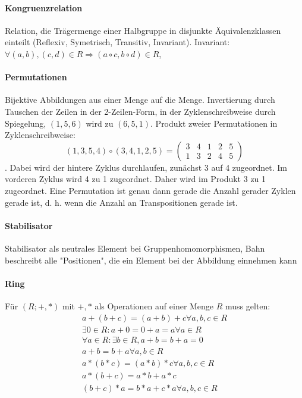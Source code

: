 \documentclass[12pt,landscape]{article}
\begin{document}
\begin{multicols}{3}
\paragraph{Kongruenzrelation} Relation, die Trägermenge einer Halbgruppe in disjunkte Äquivalenzklassen einteilt (Reflexiv, Symetrisch, Transitiv, Invariant). Invariant: $\forall (a,b),(c,d) \in R \Rightarrow (a \circ c, b \circ d) \in R$, 
\paragraph{Permutationen} Bijektive Abbildungen aus einer Menge auf die Menge. Invertierung durch Tauschen der Zeilen in der 2-Zeilen-Form, in der Zyklenschreibweise durch Spiegelung, $(1, 5, 6)$ wird zu $(6, 5, 1)$. Produkt zweier Permutationen in Zyklenschreibweise: \[(1, 3, 5, 4) \circ (3, 4, 1, 2, 5) = \begin{pmatrix}
3 & 4 & 1 & 2 & 5 \\
1 & 3 & 2 & 4 & 5
\end{pmatrix}\]. Dabei wird der hintere Zyklus durchlaufen, zunächst 3 auf 4 zugeordnet. Im vorderen Zyklus wird 4 zu 1 zugeordnet. Daher wird im Produkt 3 zu 1 zugeordnet. Eine Permutation ist genau dann gerade die Anzahl gerader Zyklen gerade ist, d. h. wenn die Anzahl an Transpositionen gerade ist.
\paragraph{Stabilisator} Stabilisator als neutrales Element bei Gruppenhomomorphismen, Bahn beschreibt alle "Positionen", die ein Element bei der Abbildung einnehmen kann
\paragraph{Ring} Für $(R; +, *)$ mit $+, *$ als Operationen auf einer Menge $R$ muss gelten:
\begin{eqnarray}
a + (b + c) = (a + b) + c \forall a,b,c \in R \\
\exists 0 \in R: a + 0 = 0 + a = a \forall a \in R \\
\forall a \in R: \exists b \in R, a + b = b + a = 0 \\
a + b = b + a \forall a, b \in R \\
a * (b * c) = (a * b) * c \forall a, b, c \in R \\
a * (b + c) = a * b + a * c \\
(b + c) * a = b * a + c * a \forall a, b, c \in R
\end{eqnarray}

\end{multicols}
\end{document}
